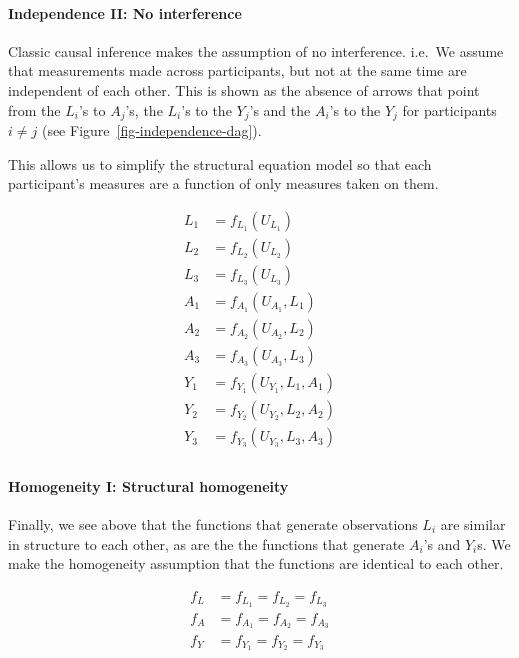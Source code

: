 \documentclass[
  letterpaper,
  DIV=11,
  numbers=noendperiod,
  oneside]{scrreprt}
\let\oldparagraph\paragraph
\renewcommand{\paragraph}[1]{\oldparagraph{#1}\mbox{}}
\begin{document}
\hypertarget{independence-ii-no-interference}{%
\paragraph{Independence II: No
interference}\label{independence-ii-no-interference}}

Classic causal inference makes the assumption of no interference.
i.e.~We assume that measurements made across participants, but not at
the same time are independent of each other. This is shown as the
absence of arrows that point from the \(L_i\)'s to \(A_j\)'s, the
\(L_i\)'s to the \(Y_j\)'s and the \(A_i\)'s to the \(Y_j\) for
participants \(i\neq j\) (see Figure~\ref{fig-independence-dag}).

This allows us to simplify the structural equation model so that each
participant's measures are a function of only measures taken on them.

\[
\begin{aligned}
L_1 &= f_{L_1}( U_{L_1}) \\
L_2 &= f_{L_2}( U_{L_2}) \\
L_3 &= f_{L_3}( U_{L_3}) \\
A_1 &= f_{A_1}( U_{A_1}, L_1) \\
A_2 &= f_{A_2}( U_{A_2}, L_2) \\
A_3 &= f_{A_3}( U_{A_3}, L_3) \\
Y_1 &= f_{Y_1}( U_{Y_1}, L_1, A_1 ) \\
Y_2 &= f_{Y_2}( U_{Y_2}, L_2, A_2 ) \\
Y_3 &= f_{Y_3}( U_{Y_3}, L_3, A_3 ) \\
\end{aligned}
\]

\hypertarget{homogeneity-i-structural-homogeneity}{%
\paragraph{Homogeneity I: Structural
homogeneity}\label{homogeneity-i-structural-homogeneity}}

Finally, we see above that the functions that generate observations
\(L_i\) are similar in structure to each other, as are the the functions
that generate \(A_i\)'s and \(Y_i\)s. We make the homogeneity assumption
that the functions are identical to each other.

\[
\begin{aligned}
 f_L &= f_{L_1} = f_{L_2} = f_{L_3} \\
 f_A &= f_{A_1} = f_{A_2} = f_{A_3} \\
 f_Y &= f_{Y_1} = f_{Y_2} = f_{Y_3}  \\
\end{aligned}
\]
\end{document}

